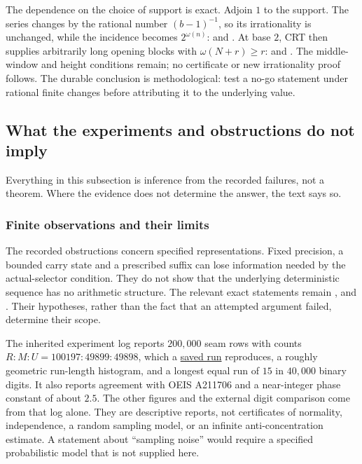 The dependence on the choice of support is exact.  Adjoin $1$ to the support.  The series
changes by the rational number $(b-1)^{-1}$, so its irrationality is
unchanged, while the incidence becomes $2^{\omega(n)}$:
and
.
At base $2$, CRT then supplies arbitrarily long opening blocks with
$\omega(N+r)\ge r$:
and
.
The middle-window and height conditions remain; no certificate or new
irrationality proof follows.  The durable conclusion is methodological:
test a no-go statement under rational finite changes before attributing it
to the underlying value.

\subsection{What the experiments and obstructions do not imply}
\label{sec:invent-shape}

Everything in this subsection is inference from the recorded failures, not a theorem.  Where
the evidence does not determine the answer, the text says so.

\subsubsection*{Finite observations and their limits}
The recorded obstructions concern specified representations.  Fixed
precision, a bounded carry state and a prescribed suffix can lose
information needed by the actual-selector condition.  They do not show
that the underlying deterministic sequence has no arithmetic structure.
The relevant exact statements remain
,
and
.
Their hypotheses, rather than the fact that an attempted argument failed,
determine their scope.

The inherited experiment log reports $200{,}000$ seam rows with counts
$R:M:U=100197:49899:49898$, which a
\href{https://github.com/wcook04/plectis-erdos/blob/f757115e03bebe5c04431a147da559015c680a37/research/experiments/erdos257/receipts/seam-orbit-200000.json}{saved run}
reproduces, a roughly geometric run-length histogram, and a
longest equal run of $15$ in $40{,}000$ binary digits.  It also reports
agreement with OEIS A211706 and a near-integer phase constant of about
$2.5$.  The other figures and the external digit comparison come from
that log alone.  They are descriptive reports, not certificates of
normality, independence, a random sampling model, or an infinite
anti-concentration estimate.  A statement about ``sampling noise'' would
require a specified probabilistic model that is not supplied here.

